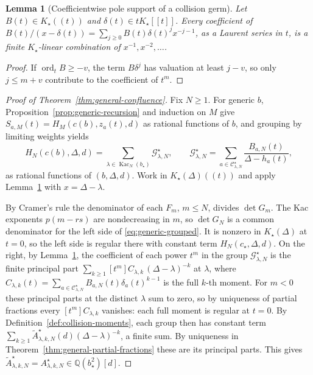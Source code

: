\documentclass[twoside,10pt]{article}
\numberwithin{equation}{section}
\theoremstyle{slbody}
\newtheorem{lemma}[theorem]{Lemma}
\theoremstyle{definition}
\theoremstyle{remark}
\newcommand{\ord}{\operatorname{ord}}
\begin{document}
\begin{lemma}[Coefficientwise pole support of a collision germ]
\label{lem:collision-pole-support}
Let \(B(t)\in K_\star((t))\) and
\(\delta(t)\in tK_\star[[t]]\).  Every coefficient of
\(B(t)/(x-\delta(t))=\sum_{j\geq0}B(t)\delta(t)^jx^{-j-1}\), as a Laurent
series in \(t\), is a finite \(K_\star\)-linear combination of
\(x^{-1},x^{-2},\ldots\).
\end{lemma}

\begin{proof}
If \(\ord_tB\geq-v\), the term \(B\delta^j\) has valuation at least
\(j-v\), so only \(j\leq m+v\) contribute to the coefficient of \(t^m\).
\end{proof}

\begin{proof}[Proof of Theorem~\ref{thm:general-confluence}]
Fix \(N\geq1\).  For generic \(b\), Proposition~\ref{prop:generic-recursion}
and induction on \(M\) give \(S_{a,M}(t)=H_M(c(b),z_a(t),d)\) as rational
functions of \(b\), and grouping by limiting weights yields
\begin{equation}\label{eq:generic-grouped}
 H_N(c(b),\Delta,d)
 =\sum_{\lambda\in\operatorname{Kac}_N(b_\star)}{\mathcal G}^\star_{\lambda,N},\qquad
 {\mathcal G}^{\star}_{\lambda,N}
 =\sum_{a\in{\mathcal C}^{\star}_{\lambda,N}}
 \frac{B_{a,N}(t)}{\Delta-h_a(t)},
\end{equation}
as rational functions of \((b,\Delta,d)\). Work in
\(K_\star(\Delta)((t))\) and apply Lemma~\ref{lem:collision-pole-support}
with \(x=\Delta-\lambda\).

By Cramer's rule the denominator of each \(F_m\), \(m\leq N\), divides
\(\det G_m\). The Kac exponents \(p(m-rs)\) are nondecreasing in \(m\), so
\(\det G_N\) is a common denominator for the left side of
\eqref{eq:generic-grouped}. It is nonzero in \(K_\star(\Delta)\) at
\(t=0\), so the left side is regular there with constant term
\(H_N(c_\star,\Delta,d)\).  On the right, by Lemma~\ref{lem:collision-pole-support},
the coefficient of each power \(t^m\) in the group \({\mathcal G}^\star_{\lambda,N}\)
is the finite principal part
\(\sum_{k\geq1}[t^m]C_{\lambda,k}\,(\Delta-\lambda)^{-k}\) at \(\lambda\), where
\(C_{\lambda,k}(t)=\sum_{a\in{\mathcal C}^\star_{\lambda,N}}B_{a,N}(t)\delta_a(t)^{k-1}\)
is the full \(k\)-th moment.  For \(m<0\) these principal parts at the distinct
\(\lambda\) sum to zero, so by uniqueness of partial fractions every
\([t^m]C_{\lambda,k}\) vanishes: each full moment is regular at \(t=0\).  By
Definition~\ref{def:collision-moments}, each group then has constant term
\(\sum_{k\geq1}\widetilde A^\star_{\lambda,k,N}(d)(\Delta-\lambda)^{-k}\),
a finite sum.  By uniqueness in Theorem~\ref{thm:general-partial-fractions}
these are its principal parts.  This gives \(\widetilde A^\star_{\lambda,k,N}
=A^\star_{\lambda,k,N}\in\mathbb Q(b_\star^2)[d]\).


\end{proof}
\end{document}

